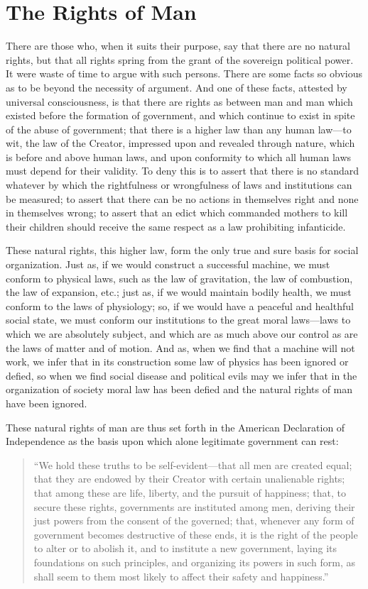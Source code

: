 \documentclass{book}
\begin{document}
\chapter{The Rights of Man}
\label{chapter-10}
There are those who, when it suits their purpose, say that there are no natural rights, but that all rights spring from the grant of the sovereign political power. It were waste of time to argue with such persons. There are some facts so obvious as to be beyond the necessity of argument. And one of these facts, attested by universal consciousness, is that there are rights as between man and man which existed before the formation of government, and which continue to exist in spite of the abuse of government; that there is a higher law than any human law—to wit, the law of the Creator, impressed upon and revealed through nature, which is before and above human laws, and upon conformity to which all human laws must depend for their validity. To deny this is to assert that there is no standard whatever by which the rightfulness or wrongfulness of laws and institutions can be measured; to assert that there can be no actions in themselves right and none in themselves wrong; to assert that an edict which commanded mothers to kill their children should receive the same respect as a law prohibiting infanticide.

These natural rights, this higher law, form the only true and sure basis for social organization. Just as, if we would construct a successful machine, we must conform to physical laws, such as the law of gravitation, the law of combustion, the law of expansion, etc.; just as, if we would maintain bodily health, we must conform to the laws of physiology; so, if we would have a peaceful and healthful social state, we must conform our institutions to the great moral laws—laws to which we are absolutely subject, and which are as much above our control as are the laws of matter and of motion. And as, when we find that a machine will not work, we infer that in its construction some law of physics has been ignored or defied, so when we find social disease and political evils may we infer that in the organization of society moral law has been defied and the natural rights of man have been ignored.

These natural rights of man are thus set forth in the American Declaration of Independence as the basis upon which alone legitimate government can rest:

\begin{quotation}
	“We hold these truths to be self-evident—that all men are created equal; that they are endowed by their Creator with certain unalienable rights; that among these are life, liberty, and the pursuit of happiness; that, to secure these rights, governments are instituted among men, deriving their just powers from the consent of the governed; that, whenever any form of government becomes destructive of these ends, it is the right of the people to alter or to abolish it, and to institute a new government, laying its foundations on such principles, and organizing its powers in such form, as shall seem to them most likely to affect their safety and happiness.”
\end{quotation}
\end{document}

